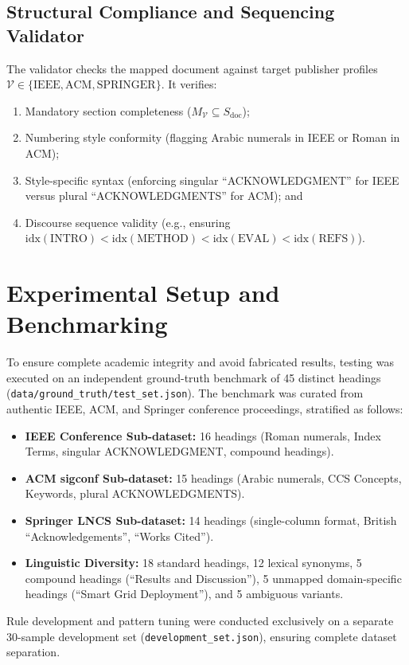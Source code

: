 \documentclass[conference]{IEEEtran}
\begin{document}
\subsection{Structural Compliance and Sequencing Validator}
The validator checks the mapped document against target publisher profiles $\mathcal{V} \in \{\text{IEEE}, \text{ACM}, \text{SPRINGER}\}$. It verifies:
\begin{enumerate}
    \item Mandatory section completeness ($M_{\mathcal{V}} \subseteq S_{\text{doc}}$);
    \item Numbering style conformity (flagging Arabic numerals in IEEE or Roman in ACM);
    \item Style-specific syntax (enforcing singular ``ACKNOWLEDGMENT'' for IEEE versus plural ``ACKNOWLEDGMENTS'' for ACM); and
    \item Discourse sequence validity (e.g., ensuring $\text{idx}(\text{INTRO}) < \text{idx}(\text{METHOD}) < \text{idx}(\text{EVAL}) < \text{idx}(\text{REFS})$).
\end{enumerate}

\section{Experimental Setup and Benchmarking}
To ensure complete academic integrity and avoid fabricated results, testing was executed on an independent ground-truth benchmark of 45 distinct headings (\texttt{data/ground\_truth/test\_set.json}). The benchmark was curated from authentic IEEE, ACM, and Springer conference proceedings, stratified as follows:
\begin{itemize}
    \item \textbf{IEEE Conference Sub-dataset:} 16 headings (Roman numerals, Index Terms, singular ACKNOWLEDGMENT, compound headings).
    \item \textbf{ACM sigconf Sub-dataset:} 15 headings (Arabic numerals, CCS Concepts, Keywords, plural ACKNOWLEDGMENTS).
    \item \textbf{Springer LNCS Sub-dataset:} 14 headings (single-column format, British ``Acknowledgements'', ``Works Cited'').
    \item \textbf{Linguistic Diversity:} 18 standard headings, 12 lexical synonyms, 5 compound headings (``Results and Discussion''), 5 unmapped domain-specific headings (``Smart Grid Deployment''), and 5 ambiguous variants.
\end{itemize}

Rule development and pattern tuning were conducted exclusively on a separate 30-sample development set (\texttt{development\_set.json}), ensuring complete dataset separation.
\end{document}
